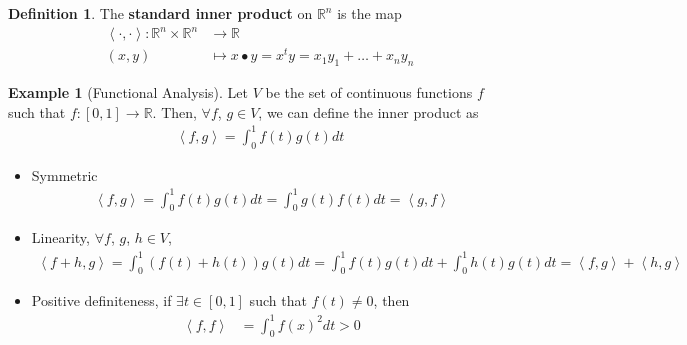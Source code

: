 \documentclass[letterpaper,12pt]{article}
\theoremstyle{definition}
\newtheorem*{definition}{Definition}
\newtheorem*{example}{Example}
\newcommand{\inp}[2]{\left< #1, #2 \right>}
\begin{document}
\begin{definition}
The \textbf{standard inner product} on $\mathbb{R}^n$ is the map
\begin{align*}
    \inp{\cdot}{\cdot}: \mathbb{R}^n \times \mathbb{R}^n & \longrightarrow \mathbb{R} \\
    (x,y) & \longmapsto x \bullet y = x^ty = x_1y_1 + \dots + x_ny_n
\end{align*}
\end{definition}

\begin{example}[Functional Analysis]
Let $V$ be the set of continuous functions $f$ such that $f: [0,1] \rightarrow \mathbb{R}$. Then, $\forall f$, $g \in V$, we can define the inner product as
\begin{align*}
    \inp{f}{g} = \int_0^1 f(t)g(t)dt
\end{align*}
\begin{itemize}
    \item Symmetric
    \begin{align*}
        \inp{f}{g} = \int_0^1 f(t)g(t)dt = \int_0^1 g(t)f(t)dt = \inp{g}{f}
    \end{align*}
    \item Linearity, $\forall f$, $g$, $h \in V$,
    \begin{align*}
        \inp{f+h}{g} = \int_0^1 (f(t) + h(t))g(t)dt = \int_0^1 f(t)g(t)dt + \int_0^1 h(t)g(t)dt = \inp{f}{g} + \inp{h}{g}
    \end{align*}
    \item Positive definiteness, if $\exists t \in [0,1]$ such that $f(t) \neq 0$, then
    \begin{align*}
        \inp{f}{f} & = \int_0^1 f(x)^2 dt > 0
    \end{align*}
\end{itemize}
\end{example}
\end{document}
